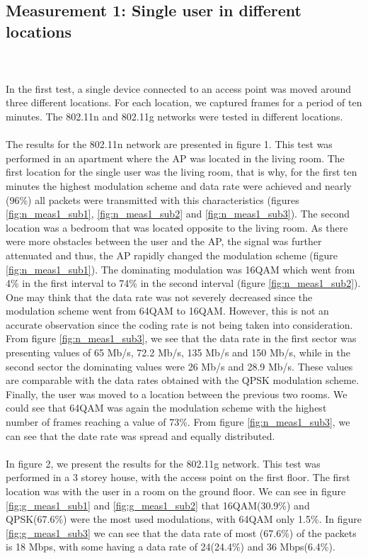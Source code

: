 \documentclass[12]{article}
\begin{document}
\subsection{Measurement 1: Single user in different locations}\\\\
In the first test, a single device connected to an access point was moved around three different locations. For each location, we captured frames for a period of ten minutes. The 802.11n and 802.11g networks were tested in different locations.\\\\The results for the 802.11n network are presented in figure 1. This test was performed in an apartment where the AP was located in the living room. The first location for the single user was the living room, that is why, for the first ten minutes the highest modulation scheme and data rate were achieved and nearly (96\%) all packets were transmitted with this characteristics (figures \ref{fig:n_meas1_sub1}, \ref{fig:n_meas1_sub2} and \ref{fig:n_meas1_sub3}). The second location was a bedroom that was located opposite to the living room. As there were more obstacles between the user and the AP, the signal was further attenuated and thus, the AP rapidly changed the modulation scheme (figure \ref{fig:n_meas1_sub1}). The dominating modulation was 16QAM which went from 4\% in the first interval to 74\% in the second interval (figure \ref{fig:n_meas1_sub2}). One may think that the data rate was not severely decreased since the modulation scheme went from 64QAM to 16QAM. However, this is not an accurate observation since the coding rate is not being taken into consideration. From figure \ref{fig:n_meas1_sub3}, we see that the data rate in the first sector was presenting values of 65 Mb/s, 72.2 Mb/s, 135 Mb/s and 150 Mb/s, while in the second sector the dominating values were 26 Mb/s and 28.9 Mb/s. These values are comparable with the data rates obtained with the QPSK modulation scheme. Finally, the user was moved to a location between the previous two rooms. We could see that 64QAM was again the modulation scheme with the highest number of frames reaching a value of 73\%. From figure \ref{fig:n_meas1_sub3}, we can see that the date rate was spread and equally distributed.\\\\
In figure 2, we present the results for the 802.11g network. This test was performed in a 3 storey house, with the access point on the first floor. The first location was with the user in a room on the ground floor. We can see in figure \ref{fig:g_meas1_sub1} and \ref{fig:g_meas1_sub2} that 16QAM(30.9\%) and QPSK(67.6\%) were the most used modulations, with 64QAM only 1.5\%. In figure \ref{fig:g_meas1_sub3} we can see that the data rate of most (67.6\%) of the packets is 18 Mbps, with some having a data rate of 24(24.4\%) and 36 Mbps(6.4\%).
\end{document}
